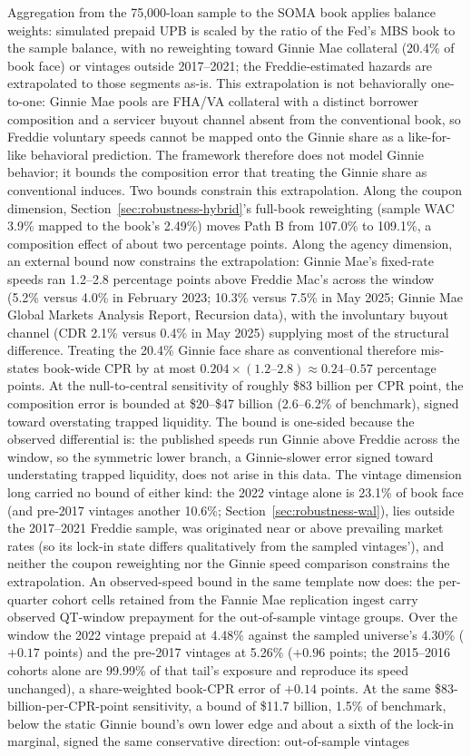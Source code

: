 \documentclass[12pt]{article}
\begin{document}
Aggregation from the 75,000-loan sample to the SOMA book applies balance weights: simulated prepaid UPB is scaled by the ratio of the Fed's MBS book to the sample balance, with no reweighting toward Ginnie Mae collateral (20.4\% of book face) or vintages outside 2017--2021; the Freddie-estimated hazards are extrapolated to those segments as-is. This extrapolation is not behaviorally one-to-one: Ginnie Mae pools are FHA/VA collateral with a distinct borrower composition and a servicer buyout channel absent from the conventional book, so Freddie voluntary speeds cannot be mapped onto the Ginnie share as a like-for-like behavioral prediction. The framework therefore does not model Ginnie behavior; it bounds the composition error that treating the Ginnie share as conventional induces. Two bounds constrain this extrapolation. Along the coupon dimension, Section~\ref{sec:robustness-hybrid}'s full-book reweighting (sample WAC 3.9\% mapped to the book's 2.49\%) moves Path B from 107.0\% to 109.1\%, a composition effect of about two percentage points. Along the agency dimension, an external bound now constrains the extrapolation: Ginnie Mae's fixed-rate speeds ran 1.2--2.8 percentage points above Freddie Mac's across the window (5.2\% versus 4.0\% in February 2023; 10.3\% versus 7.5\% in May 2025; Ginnie Mae Global Markets Analysis Report, Recursion data), with the involuntary buyout channel (CDR 2.1\% versus 0.4\% in May 2025) supplying most of the structural difference. Treating the 20.4\% Ginnie face share as conventional therefore mis-states book-wide CPR by at most $0.204 \times (1.2\text{--}2.8) \approx 0.24$--$0.57$ percentage points. At the null-to-central sensitivity of roughly \$83 billion per CPR point, the composition error is bounded at \$20--\$47 billion (2.6--6.2\% of benchmark), signed toward overstating trapped liquidity. The bound is one-sided because the observed differential is: the published speeds run Ginnie above Freddie across the window, so the symmetric lower branch, a Ginnie-slower error signed toward understating trapped liquidity, does not arise in this data. The vintage dimension long carried no bound of either kind: the 2022 vintage alone is 23.1\% of book face (and pre-2017 vintages another 10.6\%; Section~\ref{sec:robustness-wal}), lies outside the 2017--2021 Freddie sample, was originated near or above prevailing market rates (so its lock-in state differs qualitatively from the sampled vintages'), and neither the coupon reweighting nor the Ginnie speed comparison constrains the extrapolation. An observed-speed bound in the same template now does: the per-quarter cohort cells retained from the Fannie Mae replication ingest carry observed QT-window prepayment for the out-of-sample vintage groups. Over the window the 2022 vintage prepaid at 4.48\% against the sampled universe's 4.30\% ($+0.17$ points) and the pre-2017 vintages at 5.26\% ($+0.96$ points; the 2015--2016 cohorts alone are 99.99\% of that tail's exposure and reproduce its speed unchanged), a share-weighted book-CPR error of $+0.14$ points. At the same \$83-billion-per-CPR-point sensitivity, a bound of \$11.7 billion, 1.5\% of benchmark, below the static Ginnie bound's own lower edge and about a sixth of the lock-in marginal, signed the same conservative direction: out-of-sample vintages 
\end{document}

